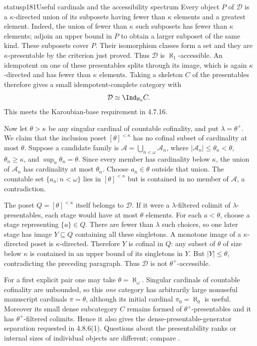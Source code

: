 \begin{dcomment}{status}{p181}{Useful cardinals and the accessibility spectrum}
Every object $P$ of $\mathcal D$ is a $\kappa$-directed union of its subposets having fewer than $\kappa$ elements and a greatest element. Indeed, the union of fewer than $\kappa$ such subposets has fewer than $\kappa$ elements; adjoin an upper bound in $P$ to obtain a larger subposet of the same kind. These subposets cover $P$. Their isomorphism classes form a set and they are $\kappa$-presentable by the criterion just proved. Thus $\mathcal D$ is $\aleph_1$-accessible. An idempotent on one of these presentables splits through its image, which is again $\kappa$-directed and has fewer than $\kappa$ elements. Taking a skeleton $C$ of the presentables therefore gives a small idempotent-complete category with
\[
 \mathcal D\simeq\Ind_{\aleph_0}C.
\]
This meets the Karoubian-base requirement in 4.7.16.

Now let $\theta>\kappa$ be any singular cardinal of countable cofinality, and put $\lambda=\theta^+$. We claim that the inclusion poset $[\theta]^{<\kappa}$ has no cofinal subset of cardinality at most $\theta$. Suppose a candidate family is $\mathscr A=\bigcup_{n<\omega}\mathscr A_n$, where $|\mathscr A_n|\leq\theta_n<\theta$, $\theta_n\geq\kappa$, and $\sup_n\theta_n=\theta$. Since every member has cardinality below $\kappa$, the union of $\mathscr A_n$ has cardinality at most $\theta_n$. Choose $a_n\in\theta$ outside that union. The countable set $\{a_n:n<\omega\}$ lies in $[\theta]^{<\kappa}$ but is contained in no member of $\mathscr A$, a contradiction.

The poset $Q=[\theta]^{<\kappa}$ itself belongs to $\mathcal D$. If it were a $\lambda$-filtered colimit of $\lambda$-presentables, each stage would have at most $\theta$ elements. For each $a<\theta$, choose a stage representing $\{a\}\in Q$. There are fewer than $\lambda$ such choices, so one later stage has image $Y\subseteq Q$ containing all these singletons. A monotone image of a $\kappa$-directed poset is $\kappa$-directed. Therefore $Y$ is cofinal in $Q$: any subset of $\theta$ of size below $\kappa$ is contained in an upper bound of its singletons in $Y$. But $|Y|\leq\theta$, contradicting the preceding paragraph. Thus $\mathcal D$ is not $\theta^+$-accessible.

For a first explicit pair one may take $\theta=\aleph_\omega$. Singular cardinals of countable cofinality are unbounded, so this \emph{one} category has arbitrarily large nonuseful manuscript cardinals $\pi=\theta$, although its initial cardinal $\pi_0=\aleph_0$ is useful. Moreover its small dense subcategory $C$ remains formed of $\theta^+$-presentables and it has $\theta^+$-filtered colimits. Hence it also gives the dense-presentable-generator separation requested in 4.8.6(1). Questions about the presentability ranks or internal sizes of individual objects are different; compare \citet[Definitions 2.5 and 2.10]{LiebermanRosickyVasey2019Sizes}.
\end{dcomment}

